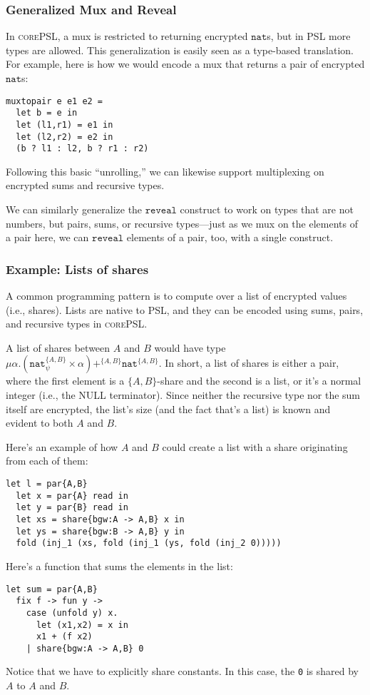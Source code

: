 \documentclass[10pt]{article}
\newcommand{\kw}[1]{\ensuremath{\mathtt{#1}}}
\newcommand{\tnat}{\ensuremath{\mathtt{nat}}}
\newcommand{\tpair}[2]{\ensuremath{{#1} \times {#2}}}
\newcommand{\tsum}[3]{\ensuremath{{#1} +^{#3} {#2}}}
\newcommand{\trec}[2]{\ensuremath{\mu {#1}.{#2}}}
\newcommand{\lang}{\textsc{corePSL}\xspace}
\begin{document}
\subsubsection{Generalized Mux and Reveal}
\label{sec:generalmux}

In \lang, a mux is restricted to returning encrypted
$\tnat$s, but in PSL more types are allowed. This generalization is
easily seen as a type-based translation. For example, here is how we
would encode a mux that returns a pair of encrypted 
$\tnat$s:
\begin{verbatim}
muxtopair e e1 e2 =
  let b = e in
  let (l1,r1) = e1 in
  let (l2,r2) = e2 in
  (b ? l1 : l2, b ? r1 : r2)
\end{verbatim}
Following this basic ``unrolling,'' we can likewise support
multiplexing on encrypted sums and recursive types.

We can similarly generalize the $\kw{reveal}$ construct to work on types
that are not numbers, but pairs, sums, or recursive types---just as we
mux on the elements of a pair here, we can \kw{reveal} elements
of a pair, too, with a single construct.

\subsubsection{Example: Lists of shares}

\newcommand{\twoprins}{\ensuremath{\{A,B\}}}

A common programming pattern is to compute over a list of encrypted
values (i.e., shares). 
%
Lists are native to PSL, and they can be encoded using sums, pairs,
and recursive types in \lang.

A list of shares between $A$ and $B$ would have type
$\trec{\alpha}{\tsum{(\tpair{\tnat^{\twoprins}_\psi}{\alpha})}{\tnat^{\twoprins}}{\twoprins}}$. In
short, a list of shares is either a pair, where the first element is a
\twoprins-share and the second is a list, or it's a normal integer
(i.e., the NULL terminator). Since neither the recursive type
nor the sum itself are encrypted, the list's size
(and the fact that's a list) is known and evident to both $A$ and $B$.

Here's an example of how $A$ and $B$ could create a list with a share
originating from each of them:
\begin{verbatim}
let l = par{A,B}
  let x = par{A} read in
  let y = par{B} read in
  let xs = share{bgw:A -> A,B} x in
  let ys = share{bgw:B -> A,B} y in
  fold (inj_1 (xs, fold (inj_1 (ys, fold (inj_2 0)))))
\end{verbatim}
Here's a function that sums the elements in the list:
\begin{verbatim}
let sum = par{A,B}
  fix f -> fun y ->
    case (unfold y) x.
      let (x1,x2) = x in
      x1 + (f x2)
    | share{bgw:A -> A,B} 0
\end{verbatim}
Notice that we have to explicitly share constants. In this case, the
\verb+0+ is shared by $A$ to $A$ and $B$.
\end{document}

